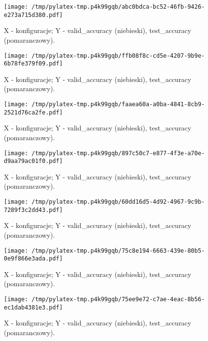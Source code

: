 \documentclass{article}%
\begin{document}
%
\newpage%


\begin{figure}[h]%
\centering%
\texttt{[image: /tmp/pylatex-tmp.p4k99gqb/abc0bdca-bc52-46fb-9426-e273a715d380.pdf]}%
\caption{X {-} konfiguracje; Y {-} valid\_accuracy (niebieski), test\_accuracy (pomaranczowy).}%
\end{figure}

%
\newpage%


\begin{figure}[h]%
\centering%
\texttt{[image: /tmp/pylatex-tmp.p4k99gqb/ffb08f8c-cd5e-4207-9b9e-6b78fe379f09.pdf]}%
\caption{X {-} konfiguracje; Y {-} valid\_accuracy (niebieski), test\_accuracy (pomaranczowy).}%
\end{figure}

%
\newpage%


\begin{figure}[h]%
\centering%
\texttt{[image: /tmp/pylatex-tmp.p4k99gqb/faaea60a-a0ba-4841-8cb9-2521d76ca2fe.pdf]}%
\caption{X {-} konfiguracje; Y {-} valid\_accuracy (niebieski), test\_accuracy (pomaranczowy).}%
\end{figure}

%
\newpage%


\begin{figure}[h]%
\centering%
\texttt{[image: /tmp/pylatex-tmp.p4k99gqb/897c50c7-e877-4f3e-a70e-d9aa79ac01f0.pdf]}%
\caption{X {-} konfiguracje; Y {-} valid\_accuracy (niebieski), test\_accuracy (pomaranczowy).}%
\end{figure}

%
\newpage%


\begin{figure}[h]%
\centering%
\texttt{[image: /tmp/pylatex-tmp.p4k99gqb/60dd16d5-4d92-4967-9c9b-7289f3c2dd43.pdf]}%
\caption{X {-} konfiguracje; Y {-} valid\_accuracy (niebieski), test\_accuracy (pomaranczowy).}%
\end{figure}

%
\newpage%


\begin{figure}[h]%
\centering%
\texttt{[image: /tmp/pylatex-tmp.p4k99gqb/75c8e194-6663-439e-80b5-0e9f866e3ada.pdf]}%
\caption{X {-} konfiguracje; Y {-} valid\_accuracy (niebieski), test\_accuracy (pomaranczowy).}%
\end{figure}

%
\newpage%


\begin{figure}[h]%
\centering%
\texttt{[image: /tmp/pylatex-tmp.p4k99gqb/75ee9e72-c7ae-4eac-8b56-ec1dab4381e3.pdf]}%
\caption{X {-} konfiguracje; Y {-} valid\_accuracy (niebieski), test\_accuracy (pomaranczowy).}%
\end{figure}
\end{document}
